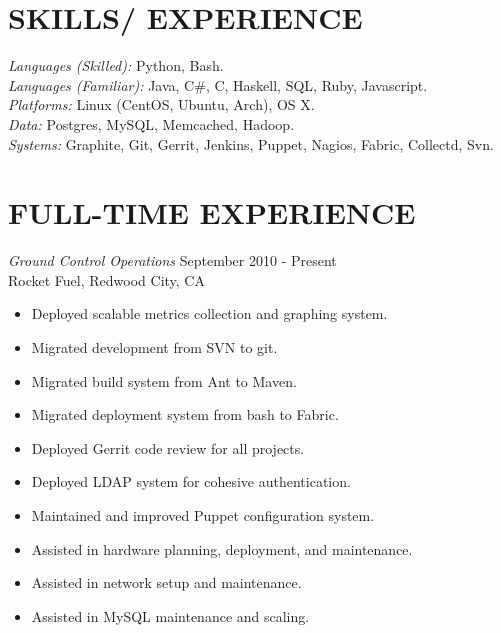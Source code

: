 \documentclass[line,margin]{res}
\begin{document}
\address{Sunnyvale, CA 94087}
\address{\sl tabletcorry@gmail.com}

\begin{resume}
 
\section{SKILLS/ EXPERIENCE} {\sl Languages (Skilled):} Python, Bash.\\
                {\sl Languages (Familiar):} Java, C\#, C, Haskell, SQL, Ruby, Javascript.\\
                {\sl Platforms:} Linux (CentOS, Ubuntu, Arch), OS X. \\
                {\sl Data:} Postgres, MySQL, Memcached, Hadoop. \\
                {\sl Systems:} Graphite, Git, Gerrit, Jenkins, Puppet, Nagios, Fabric, Collectd, Svn.
 
\section{FULL-TIME EXPERIENCE} 
                {\sl Ground Control Operations} \hfill September 2010 - Present \\
                Rocket Fuel, Redwood City, CA
                \begin{itemize}  \itemsep -2pt
                 \item Deployed scalable metrics collection and graphing system.
                 \item Migrated development from SVN to git.
                 \item Migrated build system from Ant to Maven.
                 \item Migrated deployment system from bash to Fabric.
                 \item Deployed Gerrit code review for all projects.
                 \item Deployed LDAP system for cohesive authentication.
                 \item Maintained and improved Puppet configuration system.
                 \item Assisted in hardware planning, deployment, and maintenance.
                 \item Assisted in network setup and maintenance.
                 \item Assisted in MySQL maintenance and scaling.
                \end{itemize}


\end{resume}
\end{document}
